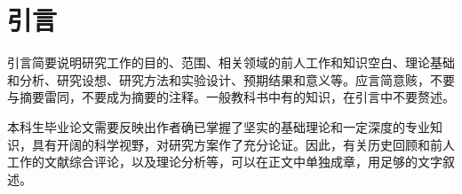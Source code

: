 
\chapter{引\hspace{1em}言}

引言简要说明研究工作的目的、范围、相关领域的前人工作和知识空白、理论基础和分析、研究设想、研究方法和实验设计、预期结果和意义等。应言简意赅，不要与摘要雷同，不要成为摘要的注释。一般教科书中有的知识，在引言中不要赘述。 

本科生毕业论文需要反映出作者确已掌握了坚实的基础理论和一定深度的专业知识，具有开阔的科学视野，对研究方案作了充分论证。因此，有关历史回顾和前人工作的文献综合评论，以及理论分析等，可以在正文中单独成章，用足够的文字叙述。